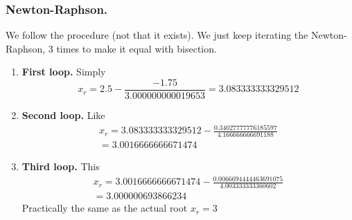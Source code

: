 \documentclass[../../../main.tex]{subfiles}
\begin{document}
\subsubsection{Newton-Raphson.} We follow the procedure (not that it exists).
We just keep iterating the Newton-Raphson, 3 times to make it equal with bisection.
\begin{enumerate}
    \item \textbf{First loop.} Simply
          \begin{equation*}
              x_r=2.5-\frac{-1.75}{3.000000000019653}=3.083333333329512
          \end{equation*}
    \item \textbf{Second loop.} Like
          \begin{multline*}
              x_r=3.083333333329512-\frac{0.34027777776185597}{4.166666666691188}\\= 3.0016666666671474
          \end{multline*}
    \item \textbf{Third loop.} This
          \begin{multline*}
              x_r=3.0016666666671474-\frac{0.0066694444463691075}{4.003333333360602}\\=3.000000693866234
          \end{multline*}
          Practically the same as the actual root $x_r=3$
\end{enumerate}
\end{document}
